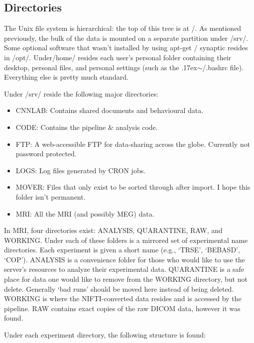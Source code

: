 \documentclass[final,titlepage,letterpaper,oneside,12pt]{article}
\renewcommand{\texttt}[2][BrickRed]{\textcolor{#1}{\ttfamily #2}}%
\newcommand{\atilde}{\raise.17ex\hbox{$\scriptstyle\mathtt{\sim}$}}
\begin{document}
\subsection{Directories}

The Unix file system is hierarchical: the top of this tree is at \texttt{/}. As mentioned previously, the bulk of the data is mounted on a separate partition under \texttt{/srv/}. Some optional software that wasn't installed by using \texttt{apt-get} / \texttt{synaptic} resides in \texttt{/opt/}. Under\texttt{/home/} resides each user's personal folder containing their desktop, personal files, and personal settings (such as the \texttt{\atilde/.bashrc} file). Everything else is pretty much standard.

Under \texttt{/srv/} reside the following major directories:
\begin{itemize} \itemsep-2pt
    \item{CNNLAB: Contains shared documents and behavioural data.}
    \item{CODE: Contains the pipeline \& analysis code.}
    \item{FTP: A web-accessible FTP for data-sharing across the globe. Currently not password protected.}
    \item{LOGS: Log files generated by \texttt{CRON} jobs.}
    \item{MOVER: Files that only exist to be sorted through after import. I hope this folder isn't permanent.}
    \item{MRI: All the MRI (and possibly MEG) data.}
\end{itemize}

In \texttt{MRI}, four directories exist: \texttt{ANALYSIS}, \texttt{QUARANTINE}, \texttt{RAW}, and \texttt{WORKING}. Under each of these folders is a mirrored set of experimental name directories. Each experiment is given a short name (e.g., `TRSE', `BEBASD', `COP'). \texttt{ANALYSIS} is a convenience folder for those who would like to use the server's resources to analyze their experimental data. \texttt{QUARANTINE} is a safe place for data one would like to remove from the \texttt{WORKING} directory, but not delete. Generally `bad runs' should be moved here instead of being deleted. \texttt{WORKING} is where the NIFTI-converted data resides and is accessed by the pipeline. \texttt{RAW} contains exact copies of the raw DICOM data, however it was found.

Under each experiment directory, the following structure is found:
\end{document}
